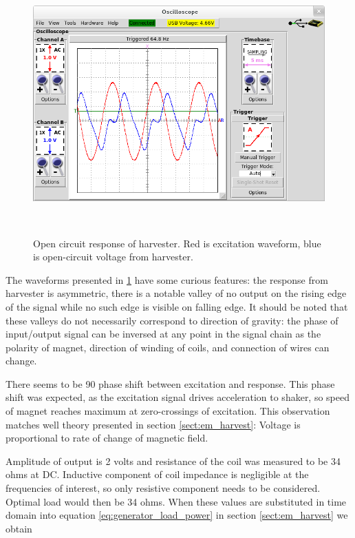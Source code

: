 \begin{figure}[htb]
\begin{center}
\includegraphics[height=10cm]{images/own_measurement/generator_shaker/inductive_td_open_65hz_dry.png}
\end{center}
\caption{\label{fig:inductive_65_open_dry} Open circuit response of harvester. Red is excitation waveform, blue is open-circuit voltage from harvester.}
\end{figure}

The waveforms presented in \ref{fig:inductive_65_open_dry} have some curious features: the response from harvester is asymmetric, there is a notable valley of no output on the rising edge of the signal while no such edge is visible on falling edge. It should be noted that these valleys do not necessarily correspond to direction of gravity: the phase of input/output signal can be inversed at any point in the signal chain as the polarity of magnet, direction of winding of coils, and connection of wires can change.

There seems to be 90 \degree phase shift between excitation and response. This phase shift was expected, as the excitation signal drives acceleration to shaker, so speed of magnet reaches maximum at zero-crossings of excitation. This observation matches well theory presented in section \ref{sect:em_harvest}: Voltage is proportional to rate of change of magnetic field. 

Amplitude of output is 2 volts and resistance of the coil was measured to be 34 ohms at DC. Inductive component of coil impedance is negligible at the frequencies of interest, so only resistive component needs to be considered. Optimal load would then be 34 ohms. When these values are substituted in time domain into equation \ref{eq:generator_load_power} in section \ref{sect:em_harvest} we obtain


